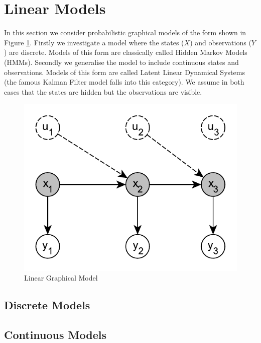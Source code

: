 \documentclass[../masters.tex]{subfiles}
\begin{document}
\graphicspath{{./imgs/}{../imgs/}} %

\section{Linear Models}
In this section we consider probabilistic graphical models of the form shown in Figure \ref{fig_linmod}. Firstly we investigate a model where the states ($X$) and observations ($Y$) are discrete. Models of this form are classically called Hidden Markov Models (HMMs). Secondly we generalise the model to include continuous states and observations. Models of this form are called Latent Linear Dynamical Systems (the famous Kalman Filter model falls into this category). We assume in both cases that the states are hidden but the observations are visible.
\begin{figure}[H] 
\centering
\includegraphics[scale=1.0]{linear_model.pdf}
\caption{Linear Graphical Model}
\label{fig_linmod}
\end{figure}

\subsection{Discrete Models}


\subsection{Continuous Models}
\end{document}
